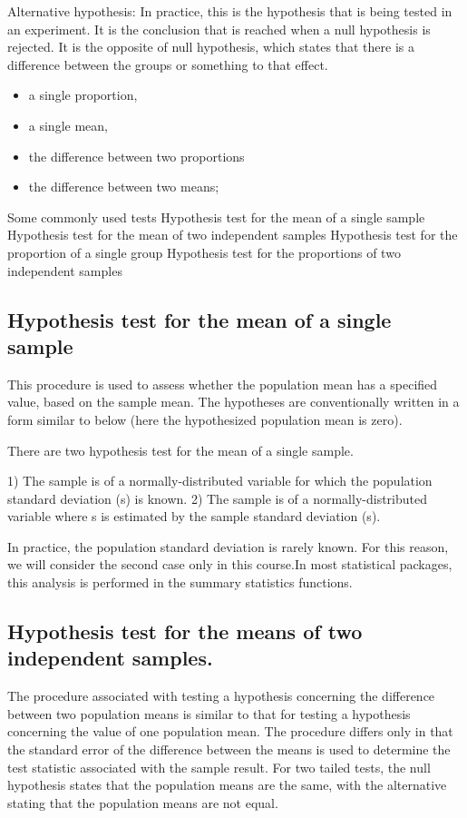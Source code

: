 Alternative hypothesis: In practice, this is the hypothesis that is being tested in an experiment. It is the conclusion that is reached when a null hypothesis is rejected. It is the opposite of null hypothesis, which states that there is a difference between the groups or something to that effect.


\begin{itemize}
\item a single proportion,
\item a single mean,
\item the difference between two proportions	
\item the difference between two means;
\end{itemize}

Some commonly used tests
   Hypothesis test for the mean of a single sample
   Hypothesis test for the mean of two independent samples
   Hypothesis test for the proportion of a single group
   Hypothesis test for the proportions of two independent samples


\subsection{Hypothesis test for the mean of a single sample}
This procedure is used to assess whether the population mean  has a specified value, based on the sample mean. The hypotheses are conventionally written in a form similar to below (here the hypothesized population mean is zero).


There are two hypothesis test for the mean of a single sample.

1) The sample is of a normally-distributed variable for which the population standard deviation (s) is known.
2) The sample is of a normally-distributed variable where s is estimated by the sample standard deviation (s).

In practice, the population standard deviation is rarely known. For this reason, we will consider the second case only in this course.In most statistical packages, this analysis is performed in the summary statistics functions.

\subsection{Hypothesis test for the means of two independent samples.}
The procedure associated with testing a hypothesis concerning the difference between two population means is similar to that for testing a hypothesis concerning the value of one population mean. The procedure differs only in that the standard error of the difference between the means is used to determine the test statistic associated with the sample result. For two tailed tests, the null hypothesis states that the population means are the same, with the alternative stating that the population means are not equal.


